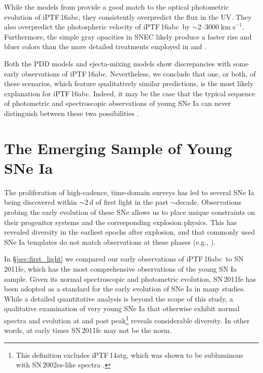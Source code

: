 \documentclass[twocolumn]{aastex61}
\newcommand{\abc}{iPTF\,16abc}
\newcommand{\sneia}{SNe Ia}
\begin{document}
While the models from \citet{2016ApJ...826...96P} provide a good match to
the optical photometric evolution of \abc, they consistently overpredict the
flux in the UV. They also overpredict the photospheric velocity of \abc\ by
$\sim$2--3000$\; \mathrm{km \; s}^{-1}$. Furthermore, the simple gray
opacities in SNEC likely produce a faster rise and bluer colors than the
more detailed treatments employed in \citet{2014MNRAS.441..532D} and
\citet{2017MNRAS.472.2787N}.

Both the PDD models and ejecta-mixing models show discrepancies with some
early observations of \abc. Nevertheless, we conclude that one, or both, of
these scenarios, which feature qualitatively similar predictions, is the
most likely explanation for \abc. Indeed, it may be the case that the
typical sequence of photometric and spectroscopic observations of young SNe
Ia can never distinguish between these two possibilities
\citep{2017MNRAS.472.2787N}.

\section{The Emerging Sample of Young \sneia}

The proliferation of high-cadence, time-domain surveys has led to several SNe
Ia being discovered within $\sim$2\,d of first light in the past $\sim$decade.
Observations probing the early evolution of these SNe allows us to place
unique constraints on their progenitor systems and the corresponding explosion
physics. This has revealed diversity in the earliest epochs after explosion,
and that commonly used SNe Ia templates do not match observations at these
phases (e.g., \citealt{2012ApJ...744...38F}).

In \S\ref{sec:first_light} we compared our early observations of \abc\ to
SN\,2011fe, which has the most comprehensive observations of the young SN Ia
sample. Given its normal spectroscopic and photometric evolution, SN\,2011fe
has been adopted as a standard for the early evolution of SNe Ia in many
studies. While a detailed quantitative analysis is beyond the scope of this
study, a qualitative examination of very young SNe Ia that otherwise exhibit
normal spectra and evolution at and post peak\footnote{This definition
excludes iPTF\,14atg, which was shown to be subluminous with SN\,2002es-like
spectra \citep{2015Natur.521..328C}.} reveals considerable diversity. In other
words, at early times SN\,2011fe may not be the norm.
\end{document}
